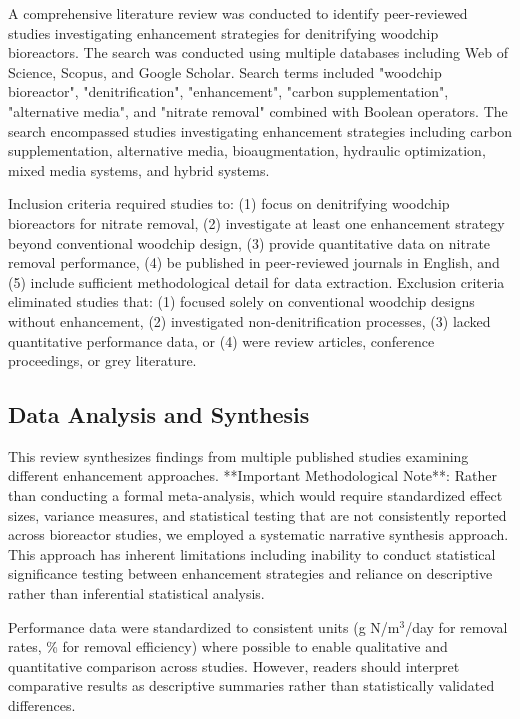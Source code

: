 \documentclass[12pt,a4paper]{article}
\begin{document}
A comprehensive literature review was conducted to identify peer-reviewed studies investigating enhancement strategies for denitrifying woodchip bioreactors. The search was conducted using multiple databases including Web of Science, Scopus, and Google Scholar. Search terms included "woodchip bioreactor", "denitrification", "enhancement", "carbon supplementation", "alternative media", and "nitrate removal" combined with Boolean operators. The search encompassed studies investigating enhancement strategies including carbon supplementation, alternative media, bioaugmentation, hydraulic optimization, mixed media systems, and hybrid systems.

Inclusion criteria required studies to: (1) focus on denitrifying woodchip bioreactors for nitrate removal, (2) investigate at least one enhancement strategy beyond conventional woodchip design, (3) provide quantitative data on nitrate removal performance, (4) be published in peer-reviewed journals in English, and (5) include sufficient methodological detail for data extraction. Exclusion criteria eliminated studies that: (1) focused solely on conventional woodchip designs without enhancement, (2) investigated non-denitrification processes, (3) lacked quantitative performance data, or (4) were review articles, conference proceedings, or grey literature.

\subsection{Data Analysis and Synthesis}

This review synthesizes findings from multiple published studies examining different enhancement approaches. **Important Methodological Note**: Rather than conducting a formal meta-analysis, which would require standardized effect sizes, variance measures, and statistical testing that are not consistently reported across bioreactor studies, we employed a systematic narrative synthesis approach. This approach has inherent limitations including inability to conduct statistical significance testing between enhancement strategies and reliance on descriptive rather than inferential statistical analysis.

Performance data were standardized to consistent units (g N/m$^3$/day for removal rates, \% for removal efficiency) where possible to enable qualitative and quantitative comparison across studies. However, readers should interpret comparative results as descriptive summaries rather than statistically validated differences.
\end{document}

